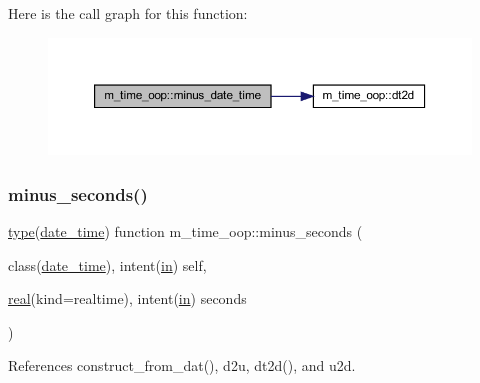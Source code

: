 Here is the call graph for this function\+:
\nopagebreak
\begin{figure}[H]
\begin{center}
\leavevmode
\includegraphics[width=350pt]{namespacem__time__oop_a3da83a42a8f957db9bd2f6f0b942ab99_cgraph}
\end{center}
\end{figure}
\mbox{\label{namespacem__time__oop_a395fbf19c6617641aea39c33fd4b2087}} 
\subsubsection{\texorpdfstring{minus\+\_\+seconds()}{minus\_seconds()}}
{\footnotesize\ttfamily \hyperlink{stop__watch_83_8txt_a70f0ead91c32e25323c03265aa302c1c}{type}(\hyperlink{structm__time__oop_1_1date__time}{date\+\_\+time}) function m\+\_\+time\+\_\+oop\+::minus\+\_\+seconds (\begin{DoxyParamCaption}\item[{class(\hyperlink{structm__time__oop_1_1date__time}{date\+\_\+time}), intent(\hyperlink{M__journal_83_8txt_afce72651d1eed785a2132bee863b2f38}{in})}]{self,  }\item[{\hyperlink{read__watch_83_8txt_abdb62bde002f38ef75f810d3a905a823}{real}(kind=realtime), intent(\hyperlink{M__journal_83_8txt_afce72651d1eed785a2132bee863b2f38}{in})}]{seconds }\end{DoxyParamCaption})\hspace{0.3cm}{\ttfamily [private]}}



References construct\+\_\+from\+\_\+dat(), d2u, dt2d(), and u2d.

